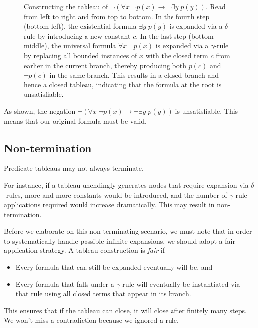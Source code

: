 \begin{figure}[H]
    \caption{Constructing the tableau of \(\neg(\forall x\; \neg p(x) \rightarrow \neg\exists y\; p(y))\). Read from left to right and from top to bottom. In the fourth step (bottom left), the existential formula \(\exists y\; p(y)\) is expanded via a \(\delta\)-rule by introducing a new constant \(c\). In the last step (bottom middle), the universal formula \(\forall x\; \neg p(x)\) is expanded via a \(\gamma\)-rule by replacing all bounded instances of \(x\) with the closed term \(c\) from earlier in the current branch, thereby producing both \(p(c)\) and \(\neg p(c)\) in the same branch. This results in a closed branch and hence a closed tableau, indicating that the formula at the root is unsatisfiable.}
    \label{fig:Ch04-satisfiability-tableau}
\end{figure}

As shown, the negation \(\neg(\forall x\; \neg p(x) \rightarrow \neg\exists y\; p(y))\) is unsatisfiable. This means that our original formula must be valid.




\subsection{Non-termination}

Predicate tableaus may not always terminate.

For instance, if a tableau unendingly generates nodes that require expansion via \(\delta\)-rules, more and more constants would be introduced, and the number of \(\gamma\)-rule applications required would increase dramatically. This may result in non-termination.

Before we elaborate on this non-terminating scenario, we must note that in order to systematically handle possible infinite expansions, we should adopt a fair application strategy. A tableau construction is \emph{fair} if
%
\begin{itemize}
    \item Every formula that can still be expanded eventually will be, and
    \item Every formula that falls under a \(\gamma\)-rule will eventually be instantiated via that rule using all closed terms that appear in its branch.
\end{itemize}
%
This ensures that if the tableau can close, it will close after finitely many steps. We won't miss a contradiction because we ignored a rule.

